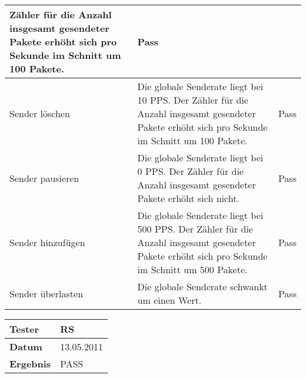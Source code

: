 \begin{table}[h]
\begin{center}
\begin{tabular}{|p{2.5cm}|p{5cm}|p{7.55cm}|}
                    Zähler für die Anzahl insgesamt gesendeter Pakete erhöht
                    sich pro Sekunde im Schnitt um 100 Pakete. & Pass\\
                \hline
                    Sender löschen & Die globale Senderate liegt bei 10 PPS. Der Zähler für die
                    Anzahl insgesamt gesendeter Pakete erhöht sich pro Sekunde
                    im Schnitt um 100 Pakete.  & Pass\\
                \hline
                    Sender pausieren & Die globale Senderate liegt bei 0 PPS. Der
                    Zähler für die Anzahl insgesamt gesendeter Pakete erhöht
                    sich nicht. & Pass\\
                \hline
                    Sender hinzufügen & Die globale Senderate
                    liegt bei 500 PPS. Der Zähler für die Anzahl insgesamt
                    gesendeter Pakete erhöht sich pro Sekunde im Schnitt um 500
                    Pakete. & Pass\\
                \hline
                    Sender überlasten & Die
                    globale Senderate schwankt um einen Wert. & Pass\\
                \hline
            \end{tabular}
             \begin{tabular}{|p{3.5cm}|p{11cm}|}
                \textbf{Tester} & RS\\
                \hline
                \textbf{Datum} & 13.05.2011\\
                \hline
                \textbf{Ergebnis} & PASS\\
                \hline
            \end{tabular}
        \end{center}
    \end{table}
    
